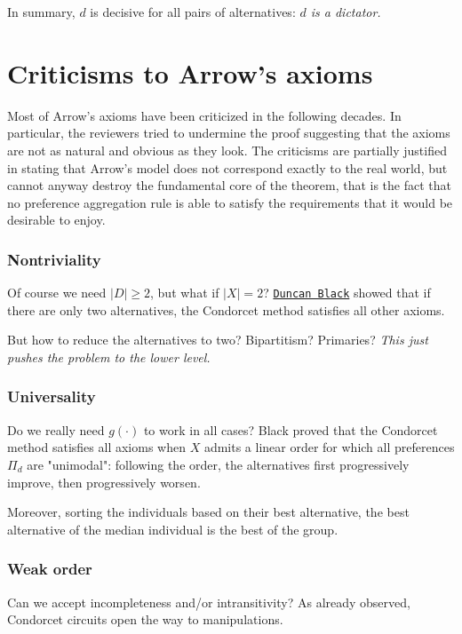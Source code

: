 In summary, $d$ is decisive for all pairs of alternatives: \textit{$d$ is a dictator.}

\section{Criticisms to Arrow's axioms}

Most of Arrow's axioms have been criticized in the following decades. In particular, the reviewers tried to undermine the proof suggesting that the axioms are not as natural and obvious as they look. The criticisms are partially justified in stating that Arrow's model does not correspond exactly to the real world, but cannot anyway destroy the fundamental core of the theorem, that is the fact that no preference aggregation rule is able to satisfy the requirements that it would be desirable to enjoy.

\subsubsection{Nontriviality}

Of course we need $|D| \geq 2$, but what if $|X| = 2$? \href{https://en.wikipedia.org/wiki/Duncan\_Black}{\texttt{Duncan Black}} showed that if there are only two alternatives, the Condorcet method satisfies all other axioms. 

But how to reduce the alternatives to two? Bipartitism? Primaries? \textit{This just pushes the problem to the lower level.}

\subsubsection{Universality}

Do we really need $g(\cdot)$ to work in all cases? Black proved that the Condorcet method satisfies all axioms when $X$ admits a linear order for which all preferences $\Pi_d$ are "unimodal": following the order, the alternatives first progressively improve, then progressively worsen.

Moreover, sorting the individuals based on their best alternative, the best alternative of the median individual is the best of the group.

\subsubsection{Weak order}

Can we accept incompleteness and/or intransitivity? As already observed, Condorcet circuits open the way to manipulations.

